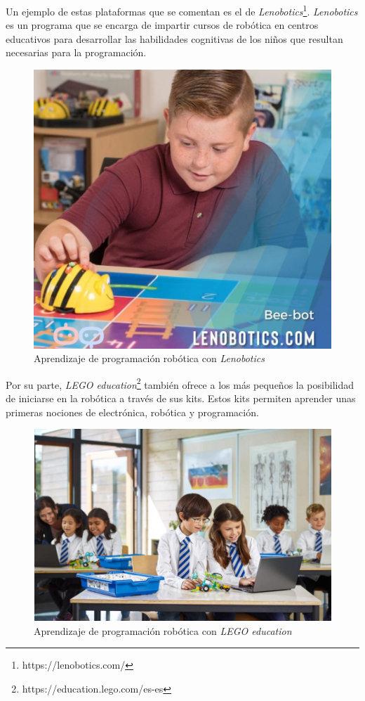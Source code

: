 Un ejemplo de estas plataformas que se comentan es el de \textit{Lenobotics}\footnote{https://lenobotics.com/}.  \textit{Lenobotics} es un programa que se encarga de impartir cursos de robótica en centros educativos para desarrollar las habilidades cognitivas de los niños que resultan necesarias para la programación. \newline

\clearpage
\begin{figure}[h!]
    \centering
    \includegraphics[scale=0.55]{lenobotics.PNG}
    \caption{Aprendizaje de programación robótica con \textit{Lenobotics}}
    \label{fig:lenobotics}
\end{figure}


Por su parte, \textit{LEGO education}\footnote{https://education.lego.com/es-es} también ofrece a los más pequeños la posibilidad de iniciarse en la robótica a través de sus kits. Estos kits permiten aprender unas primeras nociones de electrónica, robótica y programación. \newline

\begin{figure}[h!]
    \centering
    \includegraphics[scale=0.7]{lego.PNG}
    \caption{Aprendizaje de programación robótica con \textit{LEGO education}}
    \label{fig:lego}
\end{figure}

